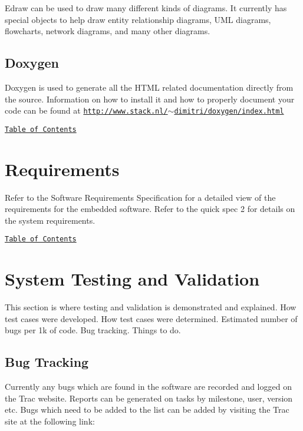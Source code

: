 Edraw can be used to draw many different kinds of diagrams. It currently has special objects to help draw entity relationship diagrams, U\-M\-L diagrams, flowcharts, network diagrams, and many other diagrams.\hypertarget{index_Doxygen}{}\subsection{Doxygen}\label{index_Doxygen}
Doxygen is used to generate all the H\-T\-M\-L related documentation directly from the source. Information on how to install it and how to properly document your code can be found at \href{http://www.stack.nl/~dimitri/doxygen/index.html}{\tt http\-://www.\-stack.\-nl/$\sim$dimitri/doxygen/index.\-html}

\par
\href{#Contents}{\tt Table of Contents}\par
 



\label{_Requirements}%
\hypertarget{index_Requirements}{}\section{Requirements}\label{index_Requirements}
Refer to the Software Requirements Specification for a detailed view of the requirements for the embedded software. Refer to the quick spec 2 for details on the system requirements.

\par
\href{#Contents}{\tt Table of Contents}\par
 



\label{_Testing}%
\hypertarget{index_Validation}{}\section{System Testing and Validation}\label{index_Validation}
This section is where testing and validation is demonstrated and explained. How test cases were developed. How test cases were determined. Estimated number of bugs per 1k of code. Bug tracking. Things to do.\hypertarget{index_Bugs}{}\subsection{Bug Tracking}\label{index_Bugs}
Currently any bugs which are found in the software are recorded and logged on the Trac website. Reports can be generated on tasks by milestone, user, version etc. Bugs which need to be added to the list can be added by visiting the Trac site at the following link\-: \par
\par


